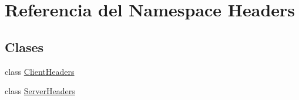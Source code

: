 \hypertarget{namespace_headers}{\section{Referencia del Namespace Headers}
\label{namespace_headers}
}
\subsection*{Clases}
\begin{DoxyCompactItemize}
\item 
class \hyperlink{class_headers_1_1_client_headers}{Client\-Headers}
\item 
class \hyperlink{class_headers_1_1_server_headers}{Server\-Headers}
\end{DoxyCompactItemize}
